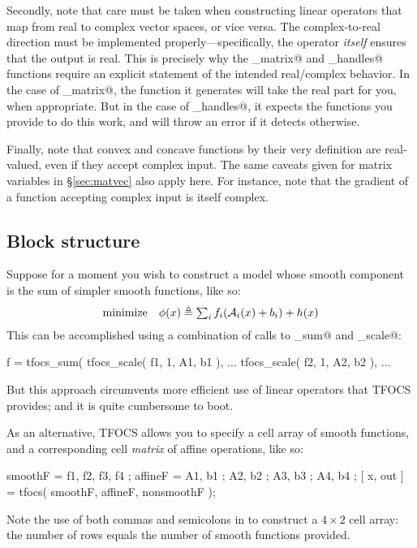 \documentclass{article}
\begin{document}
Secondly, note that care must be taken when constructing
linear operators that map from real to complex vector spaces,
or vice versa. The complex-to-real 
direction must be implemented properly---specifically, the operator 
\emph{itself} ensures that the output is real. This is precisely
why the \verb@linop_matrix@ and \verb@linop_handles@ functions
require an explicit statement of the intended real/complex behavior.
In the case of \verb@linop_matrix@, the function it generates
will take the real part for you, when appropriate. But in
the case of \verb@linop_handles@, it expects the functions you
provide to do this work, and will throw an error if it detects otherwise.

Finally, note that convex and concave functions by their very 
definition are real-valued, even if they accept complex input.
The same caveats given for matrix variables in \S\ref{sec:matvec}
also apply here. For instance, note that the gradient of a function
accepting complex input is itself complex.

\subsection{Block structure}

Suppose for a moment you wish to construct a model whose smooth component
is the sum of simpler smooth functions, like so:
\begin{equation}
	\begin{array}{ll}
		\text{minimize} & \phi(x) \triangleq \sum_i f_i(\mathcal{A}_i(x)+b_i) + h(x)
	\end{array}		
\end{equation}
This can be accomplished using a combination of
calls to \verb@tfocs_sum@ and \verb@tfocs_scale@:
\begin{code}
	f = tfocs_sum( tfocs_scale( f1, 1, A1, b1 ), ...
	               tfocs_scale( f2, 1, A2, b2 ), ...
\end{code}
But this approach circumvents more efficient use of linear operators that
TFOCS provides; and it is quite cumbersome to boot.

As an alternative, TFOCS allows you to specify a cell array of smooth
functions, and a corresponding cell \emph{matrix} of affine operations, like so:
\begin{code}
	smoothF = { f1, f2, f3, f4 };
	affineF = { A1, b1 ; A2, b2 ; A3, b3 ; A4, b4 };
	[ x, out ] = tfocs( smoothF, affineF, nonsmoothF );
\end{code}
Note the use of both commas and semicolons in \verb@affineF@ to construct
a $4\times 2$ cell array: the number of rows equals the number
of smooth functions provided. 
\end{document}
